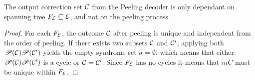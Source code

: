 \begin{lemma}\label{lem:peelingfe}
  The output correction set $\mathcal{C}$ from the Peeling decoder is only dependant on spanning tree $F_{\mathcal{E}}\subseteq\mathcal{E}$, and not on the peeling process. 
\end{lemma}
\begin{proof}
   For each $F_{\mathcal{E}}$, the outcome $\mathcal{C}$ after peeling is unique and independent from the order of peeling. If there exists two subsets $\mathcal{C}$ and $\mathcal{C}'$, applying both $\mathscr{P}(\mathcal{C})\mathscr{P}(\mathcal{C}')$ yields the empty syndrome set $\sigma=\emptyset$, which means that either $\mathscr{P}(\mathcal{C})\mathscr{P}(\mathcal{C}')$ is a cycle or $\mathcal{C}=\mathcal{C}'$. Since $F_{\mathcal{E}}$ has no cycles it means that $m{C}$ must be unique within $F_{\mathcal{E}}$.
\end{proof}



